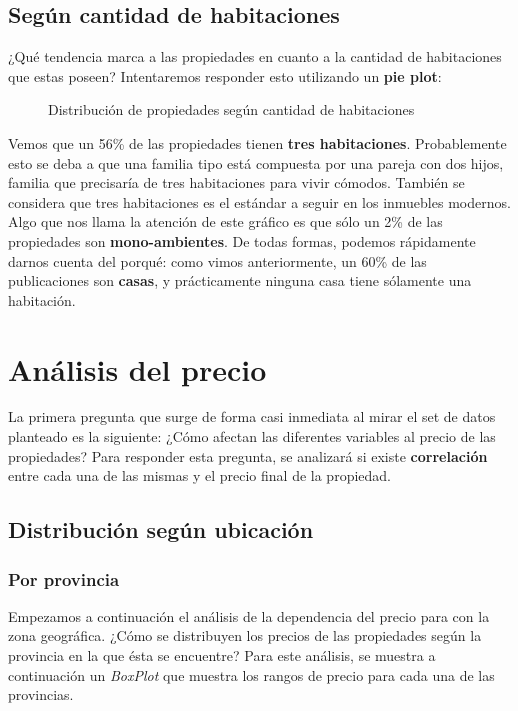 \documentclass[
10pt, %
a4paper, %
oneside, %
headinclude,footinclude, %
BCOR5mm, %
]{scrartcl}
\begin{document}
    \subsection{Seg\'un cantidad de habitaciones}
    ¿Qué tendencia marca a las propiedades en cuanto a la cantidad de habitaciones que estas poseen? Intentaremos responder esto utilizando un \textbf{pie plot}:
    
    \begin{figure}[H]
        \caption{Distribuci\'on de propiedades seg\'un cantidad de habitaciones}
        \label{fig:distribucion-habitaciones}
    \end{figure}
    
    Vemos que un 56\% de las propiedades tienen \textbf{tres habitaciones}. Probablemente esto se deba a que una familia tipo est\'a compuesta por una pareja con dos hijos, familia que precisar\'ia de tres habitaciones para vivir c\'omodos. Tambi\'en se considera que tres habitaciones es el est\'andar a seguir en los inmuebles modernos.
    \vskip 2mm
    Algo que nos llama la atenci\'on de este gr\'afico es que s\'olo un 2\% de las propiedades son \textbf{mono-ambientes}. De todas formas, podemos r\'apidamente darnos cuenta del porqu\'e: como vimos anteriormente, un 60\% de las publicaciones son \textbf{casas}, y prácticamente ninguna casa tiene s\'olamente una habitaci\'on.
    

\newpage
\section{Análisis del precio}
    La primera pregunta que surge de forma casi inmediata al mirar el set de datos planteado es la siguiente: ¿C\'omo afectan las diferentes variables al precio de las propiedades? Para responder esta pregunta, se analizar\'a si existe \textbf{correlación} entre cada una de las mismas y el precio final de la propiedad.
    
    
    
\subsection{Distribuci\'on seg\'un ubicaci\'on}
\subsubsection{Por provincia}
    Empezamos a continuaci\'on el an\'alisis de la dependencia del precio para con la zona geogr\'afica. ¿C\'omo se distribuyen los precios de las propiedades según la provincia en la que \'esta se encuentre? Para este análisis, se muestra a continuación un \textit{BoxPlot} que muestra los rangos de precio para cada una de las provincias.
    
\end{document}
